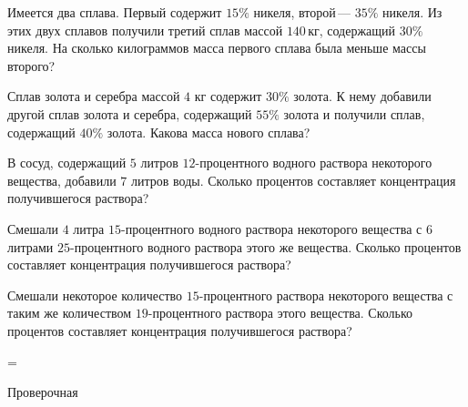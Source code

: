 \begin{class}[number=7]
\begin{listofex}
		\item Имеется два сплава. Первый содержит \(15\%\) никеля, второй --- \(35\%\) никеля. Из этих двух сплавов получили третий сплав массой \(140\) кг, содержащий \(30\%\) никеля. На сколько килограммов масса первого сплава была меньше массы второго?
		\item Сплав золота и серебра массой \(4\) кг содержит \(30\%\) золота. К нему добавили другой сплав золота и серебра, содержащий \(55\%\) золота и получили сплав, содержащий \(40\%\) золота. Какова масса нового сплава?
		\item В сосуд, содержащий \(5\) литров \(12\)-процентного водного раствора некоторого вещества, добавили \(7\) литров воды. Сколько процентов составляет концентрация получившегося раствора?
		\item Смешали \(4\) литра \(15\)-процентного водного раствора некоторого вещества с \(6\) литрами \(25\)-процентного водного раствора этого же вещества. Сколько процентов составляет концентрация получившегося раствора?
		\item Смешали некоторое количество \(15\)-процентного раствора некоторого вещества с таким же количеством \(19\)-процентного раствора этого вещества. Сколько процентов составляет концентрация получившегося раствора?
		
	\end{listofex}
\end{class}

=%
\begin{exam}
	\begin{listofex}
		\item Проверочная
	\end{listofex}
\end{exam}
